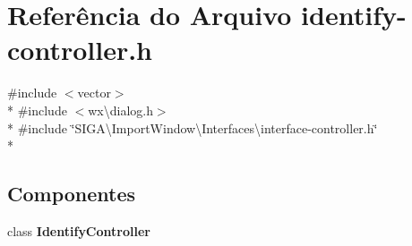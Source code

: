 \section{Referência do Arquivo identify-\/controller.h}
\label{identify-controller_8h}
{\ttfamily \#include $<$vector$>$}\\*
{\ttfamily \#include $<$wx\textbackslash{}dialog.\+h$>$}\\*
{\ttfamily \#include \char`\"{}S\+I\+G\+A\textbackslash{}\+Import\+Window\textbackslash{}\+Interfaces\textbackslash{}interface-\/controller.\+h\char`\"{}}\\*
\subsection*{Componentes}
\begin{DoxyCompactItemize}
\item 
class {\bf Identify\+Controller}
\end{DoxyCompactItemize}
